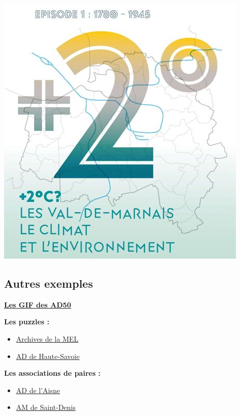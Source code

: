 \documentclass[
  letterpaper,
  DIV=11,
  numbers=noendperiod]{scrartcl}
\begin{document}
\begin{center}
\includegraphics{img/expo94.jpg}
\end{center}

\subsection{Autres exemples}\label{autres-exemples}

\href{https://www.pinterest.fr/archivesmanche/archives-gif/}{\textbf{Les
GIF des AD50}}

\textbf{Les puzzles :}

\begin{itemize}
\item
  \href{https://archives.lillemetropole.fr/jeux/puzzles/n:57}{Archives
  de la MEL}
\item
  \href{https://archives.hautesavoie.fr/jeux/puzzles/n:57}{AD de
  Haute-Savoie}
\end{itemize}

\textbf{Les associations de paires :}

\begin{itemize}
\item
  \href{https://archives.aisne.fr/jeux/jeux-de-paire/n:65}{AD de
  l'Aisne}
\item
  \href{https://archives.ville-saint-denis.fr/jeux/jeux-de-paire/n:11}{AM
  de Saint-Denis}
\end{itemize}
\end{document}
